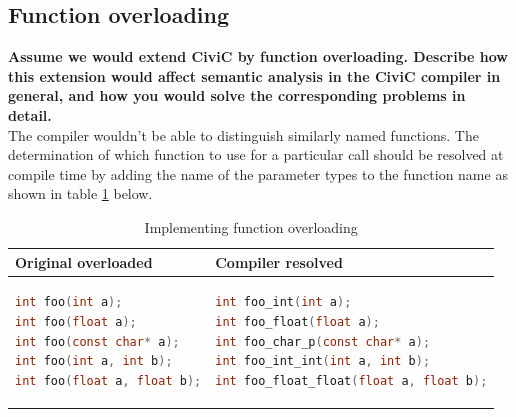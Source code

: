 \documentclass[hidelinks]{uva-inf-article}
\begin{document}
\begin{flushleft}
\section{Function overloading}
\textbf{Assume we would extend CiviC by function overloading. Describe how 
this extension would affect semantic analysis in the CiviC compiler in general, 
and how you would solve the corresponding problems in detail.\\}
The compiler wouldn't be able to distinguish similarly named functions.
The determination of which function to use for a particular call should 
be resolved at compile time by adding the name of the parameter types to the function name as shown in table \ref{tab:function-overloading} below.
\begin{table}[h!]
  \begin{center}
      \begin{tabular}{l|l} %
          \textbf{Original overloaded} & \textbf{Compiler resolved} \\
          \hline
          \begin{lstlisting}[basicstyle=\small, language=C]
int foo(int a);
int foo(float a);
int foo(const char* a);
int foo(int a, int b);
int foo(float a, float b);
          \end{lstlisting}
            &
          \begin{lstlisting}[basicstyle=\small, language=C]
int foo_int(int a);
int foo_float(float a);
int foo_char_p(const char* a);
int foo_int_int(int a, int b);
int foo_float_float(float a, float b);
          \end{lstlisting}
      \end{tabular}
      \caption{Implementing function overloading}
      \label{tab:function-overloading}
  \end{center}
\end{table}
\end{flushleft}
\end{document}
